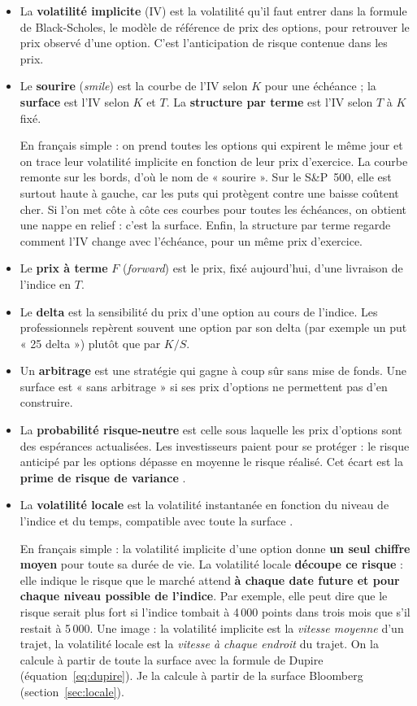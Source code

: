 \documentclass[10pt,a4paper]{article}
\begin{document}
\begin{itemize}
\item La \textbf{volatilité implicite} (IV) est la volatilité qu'il faut entrer dans la formule de Black-Scholes, le modèle de référence de prix des options, pour retrouver le prix observé d'une option. C'est l'anticipation de risque contenue dans les prix.
\item Le \textbf{sourire} (\emph{smile}) est la courbe de l'IV selon $K$ pour une échéance ; la \textbf{surface} est l'IV selon $K$ et $T$. La \textbf{structure par terme} est l'IV selon $T$ à $K$ fixé.

En français simple : on prend toutes les options qui expirent le même jour et on trace leur volatilité implicite en fonction de leur prix d'exercice. La courbe remonte sur les bords, d'où le nom de « sourire ». Sur le S\&P~500, elle est surtout haute à gauche, car les puts qui protègent contre une baisse coûtent cher. Si l'on met côte à côte ces courbes pour toutes les échéances, on obtient une nappe en relief : c'est la surface. Enfin, la structure par terme regarde comment l'IV change avec l'échéance, pour un même prix d'exercice.
\item Le \textbf{prix à terme} $F$ (\emph{forward}) est le prix, fixé aujourd'hui, d'une livraison de l'indice en $T$.
\item Le \textbf{delta} est la sensibilité du prix d'une option au cours de l'indice. Les professionnels repèrent souvent une option par son delta (par exemple un put « 25 delta ») plutôt que par $K/S$.
\item Un \textbf{arbitrage} est une stratégie qui gagne à coup sûr sans mise de fonds. Une surface est « sans arbitrage » si ses prix d'options ne permettent pas d'en construire.
\item La \textbf{probabilité risque-neutre} est celle sous laquelle les prix d'options sont des espérances actualisées. Les investisseurs paient pour se protéger : le risque anticipé par les options dépasse en moyenne le risque réalisé. Cet écart est la \textbf{prime de risque de variance} \cite{carrwu}.
\item La \textbf{volatilité locale} est la volatilité instantanée en fonction du niveau de l'indice et du temps, compatible avec toute la surface \cite{dupire}.

En français simple : la volatilité implicite d'une option donne \textbf{un seul chiffre moyen} pour toute sa durée de vie. La volatilité locale \textbf{découpe ce risque} : elle indique le risque que le marché attend \textbf{à chaque date future et pour chaque niveau possible de l'indice}. Par exemple, elle peut dire que le risque serait plus fort si l'indice tombait à 4\,000 points dans trois mois que s'il restait à 5\,000. Une image : la volatilité implicite est la \emph{vitesse moyenne} d'un trajet, la volatilité locale est la \emph{vitesse à chaque endroit} du trajet. On la calcule à partir de toute la surface avec la formule de Dupire (équation~\ref{eq:dupire}). Je la calcule à partir de la surface Bloomberg (section~\ref{sec:locale}).
\end{itemize}
\end{document}
